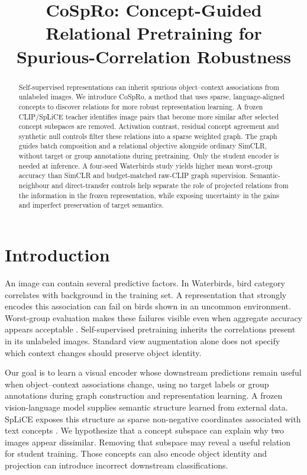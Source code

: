 \documentclass{article}
\title{CoSpRo: Concept-Guided\\Relational Pretraining for\\Spurious-Correlation Robustness}
\author{}
\begin{document}
\maketitle
\begin{abstract}
Self-supervised representations can inherit spurious object--context associations from unlabeled images. We introduce CoSpRo, a method that uses sparse, language-aligned concepts to discover relations for more robust representation learning. A frozen CLIP/SpLiCE teacher identifies image pairs that become more similar after selected concept subspaces are removed. Activation contrast, residual concept agreement and synthetic null controls filter these relations into a sparse weighted graph. The graph guides batch composition and a relational objective alongside ordinary SimCLR, without target or group annotations during pretraining. Only the student encoder is needed at inference. A four-seed Waterbirds study yields higher mean worst-group accuracy than SimCLR and budget-matched raw-CLIP graph supervision. Semantic-neighbour and direct-transfer controls help separate the role of projected relations from the information in the frozen representation, while exposing uncertainty in the gains and imperfect preservation of target semantics.
\end{abstract}

\section{Introduction}
An image can contain several predictive factors. In Waterbirds, bird category correlates with background in the training set. A representation that strongly encodes this association can fail on birds shown in an uncommon environment. Worst-group evaluation makes these failures visible even when aggregate accuracy appears acceptable \citep{sagawa2020groupdro}. Self-supervised pretraining inherits the correlations present in its unlabeled images. Standard view augmentation alone does not specify which context changes should preserve object identity.

Our goal is to learn a visual encoder whose downstream predictions remain useful when object--context associations change, using no target labels or group annotations during graph construction and representation learning. A frozen vision-language model supplies semantic structure learned from external data. SpLiCE exposes this structure as sparse non-negative coordinates associated with text concepts \citep{bhalla2024splice}. We hypothesize that a concept subspace can explain why two images appear dissimilar. Removing that subspace may reveal a useful relation for student training. Those concepts can also encode object identity and projection can introduce incorrect downstream classifications.
\end{document}
